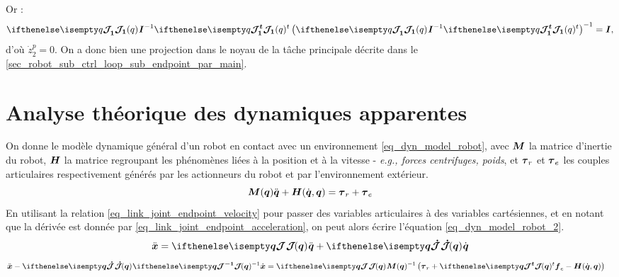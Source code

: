 \begin{appendices}
	Or :
	\begin{equation*}
		\jacobian{q}{1}{} \matr{I}^{-1} \jacobian{q}{1}{t} \left( \jacobian{q}{1}{} \matr{I}^{-1} \jacobian{q}{1}{t} \right)^{-1} = \matr{I},
	\end{equation*} 
	d'où $ \dot{z}_2^p = 0 $. On a donc bien une projection dans le noyau de la tâche principale décrite dans le \cref{sec_robot_sub_ctrl_loop_sub_endpoint_par_main}.

	\newpage
	\section{Analyse théorique des dynamiques apparentes}
	\label{app_apparent_dyn_robot}
	
	
	On donne le modèle dynamique général d'un robot en contact avec un environnement \cref{eq_dyn_model_robot}, avec $ \matr{M} $ la matrice d'inertie du robot, $ \matr{H} $ la matrice regroupant les phénomènes liées à la position et à la vitesse - \textit{e.g., forces centrifuges, poids}, et $ \vect{\tau}_r $ et $ \vect{\tau}_{e} $ les couples articulaires respectivement générés par les actionneurs du robot et par l'environnement extérieur.
	\begin{equation} \label{eq_dyn_model_robot}
	\matr{M}(\vect{q})\ddot{\vect{q}} + \matr{H}(\dot{\vect{q}}, \vect{q}) = \vect{\tau}_r + \vect{\tau}_{e}
	\end{equation}
	En utilisant la relation \cref{eq_link_joint_endpoint_velocity} pour passer des variables articulaires à des variables cartésiennes, et en notant que la dérivée est donnée par \cref{eq_link_joint_endpoint_acceleration}, on peut alors écrire l'équation \cref{eq_dyn_model_robot_2}.
	\begin{equation} \label{eq_link_joint_endpoint_acceleration}
	\ddot{\vect{X}} = \jacobian{\vect{q}}{}{} \ddot{\vect{q}} + \jacobianDot{\vect{q}}{}{} \dot{\vect{q}}
	\end{equation}
	\begin{equation} \label{eq_dyn_model_robot_2}
	\begin{split}
	\ddot{\vect{x}} - \jacobianDot{\vect{q}}{}{} \jacobian{\vect{q}}{}{-1} \dot{\vect{x}} &= \jacobian{\vect{q}}{}{} \matr{M}(\vect{q})^{-1} \left( \vect{\tau}_r + \jacobian{\vect{q}}{}{t} \vect{f}_{e} - \matr{H}(\dot{\vect{q}}, \vect{q}) \right)
	\end{split}
	\end{equation}
	

\end{appendices}
